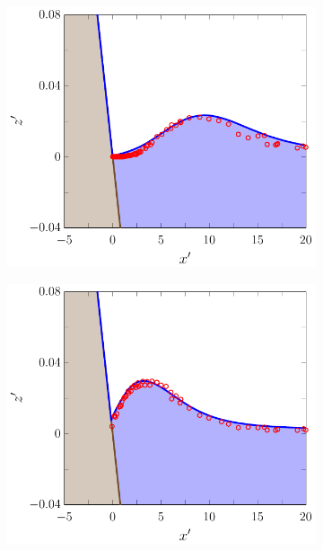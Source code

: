 \begin{figure}
	\centering
	\begin{subfigure}{0.5\textwidth}
		\includegraphics[width=\textwidth]{./chp6/figures/Experiment/Synolakis/H0p0185/FDVM/30s.pdf}
		\vspace{0.5cm}
	\end{subfigure}%
	\begin{subfigure}{0.5\textwidth}
		\includegraphics[width=\textwidth]{./chp6/figures/Experiment/Synolakis/H0p0185/FDVM/40s.pdf}

\end{subfigure}
\end{figure}
